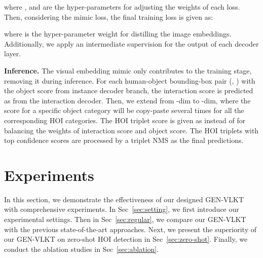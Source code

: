 \documentclass[10pt,twocolumn,letterpaper]{article}
\begin{document}
where ,  and  are the hyper-parameters for adjusting the weights of each loss. Then, considering the mimic loss, the final training loss is given as:

where  is the hyper-parameter weight for distilling the image embeddings. Additionally, we apply an intermediate supervision for the output of each decoder layer.

\vspace{1mm}\noindent\textbf{Inference.} The visual embedding mimic only contributes to the training stage, removing it during inference. For each human-object bounding-box pair (, ) with the object score  from instance decoder branch, the interaction score is predicted as  from the interaction decoder. Then, we extend  from -dim to -dim, where the score for a specific object category will be copy-paste several times for all the corresponding HOI categories. The HOI triplet score is given as  instead of  for balancing the weights of interaction score and object score. The HOI triplets with top  confidence scores are processed by a triplet NMS as the final predictions.

\vspace{-2mm}\section{Experiments}\vspace{-1mm}
In this section, we demonstrate the effectiveness of our designed GEN-VLKT with comprehensive experiments. In Sec~\ref{sec:setting}, we first introduce our experimental settings. Then in Sec~\ref{sec:regular}, we compare our GEN-VLKT with the previous state-of-the-art approaches. Next, we present the superiority of our GEN-VLKT on zero-shot HOI detection in Sec~\ref{sec:zero-shot}. Finally, we conduct the ablation studies in Sec~\ref{sec:ablation}.
\end{document}

